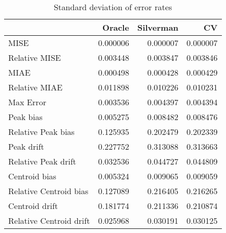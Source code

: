 \begin{table}[ht]
\centering
\begin{tabular}{lrrr}
  \hline
 & Oracle & Silverman & CV \\ 
  \hline
MISE & 0.000006 & 0.000007 & 0.000007 \\ 
  Relative MISE & 0.003448 & 0.003847 & 0.003846 \\ 
  MIAE & 0.000498 & 0.000428 & 0.000429 \\ 
  Relative MIAE & 0.011898 & 0.010226 & 0.010231 \\ 
  Max Error & 0.003536 & 0.004397 & 0.004394 \\ 
  Peak bias & 0.005275 & 0.008482 & 0.008476 \\ 
  Relative Peak bias & 0.125935 & 0.202479 & 0.202339 \\ 
  Peak drift & 0.227752 & 0.313088 & 0.313663 \\ 
  Relative Peak drift & 0.032536 & 0.044727 & 0.044809 \\ 
  Centroid bias & 0.005324 & 0.009065 & 0.009059 \\ 
  Relative Centroid bias & 0.127089 & 0.216405 & 0.216265 \\ 
  Centroid drift & 0.181774 & 0.211336 & 0.210874 \\ 
  Relative Centroid drift & 0.025968 & 0.030191 & 0.030125 \\ 
   \hline
\end{tabular}
\caption{Standard deviation of error rates} 
\label{tbl:stddev_error_rates}
\end{table}
